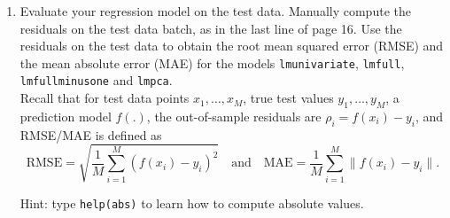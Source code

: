 \begin{enumerate}
\newpage
\item Evaluate your regression model on the test data. Manually compute the residuals on the test data batch, as in the last line of page 16. Use the residuals on the test data to obtain the root mean squared error (RMSE) and the mean absolute error (MAE) for the models \texttt{lmunivariate}, \texttt{lmfull}, \texttt{lmfullminusone} and \texttt{lmpca}.\\
    Recall that for test data points $x_1,\dots, x_M$, true test values $y_1,\dots, y_M$, a prediction model $f(.)$, the out-of-sample residuals are $\rho_i = f(x_i) - y_i$, and RMSE/MAE is defined as
    $$\mbox{RMSE}=\sqrt{\frac{1}{M}\sum_{i=1}^M \left(f(x_i)-y_i\right)^2}\quad\mbox{and}\quad \mbox{MAE}=\frac{1}{M}\sum_{i=1}^M \| f(x_i)-y_i\|.$$
    

Hint: type \texttt{help(abs)} to learn how to compute absolute values.


\end{enumerate}






